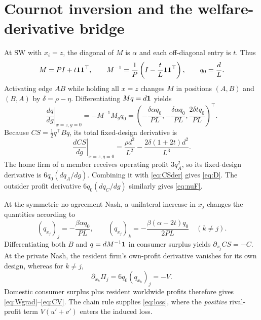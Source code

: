 \documentclass[11pt,a4paper]{article}
\theoremstyle{remark}\newtheorem{remark}[theorem]{Remark}
\newcommand{\SW}{\mathrm{SW}}\newcommand{\SU}{\mathrm{SU}}\newcommand{\IS}{\mathrm{IS}}
\begin{document}
\clearpage
\appendix
\section{Cournot inversion and the welfare-derivative bridge}\label{app:bridge}
At $\SW$ with $x_i=z$, the diagonal of $M$ is $\alpha$ and each off-diagonal entry is $t$. Thus
\begin{equation}\label{eq:inv}
M=P I+t\boldsymbol{1}\boldsymbol{1}^{\top},\qquad
M^{-1}=\frac1P\left(I-\frac{t}{L}\boldsymbol{1}\boldsymbol{1}^{\top}\right),\qquad q_0=\frac dL.
\end{equation}
Activating edge $AB$ while holding all $x=z$ changes $M$ in positions $(A,B)$ and $(B,A)$ by $\delta=\rho-\eta$. Differentiating $Mq=d\boldsymbol{1}$ yields
\begin{equation}\label{eq:quantityDer}
\left.\frac{dq}{dg}\right|_{x=z,g=0}=-M^{-1}M_gq_0
=\left(-\frac{\delta\alpha q_0}{PL},-\frac{\delta\alpha q_0}{PL},\frac{2\delta t q_0}{PL}\right)^\top.
\end{equation}
Because $CS=\tfrac12q^\top Bq$, its total fixed-design derivative is
\begin{equation}\label{eq:CSder}
\left.\frac{dCS}{dg}\right|_{x=z,g=0}
=\frac{\rho d^2}{L^2}-\frac{2\delta(1+2t)d^2}{L^3}.
\end{equation}
The home firm of a member receives operating profit $3q_A^2$, so its fixed-design derivative is $6q_0(dq_A/dg)$. Combining it with \eqref{eq:CSder} gives \eqref{eq:D}. The outsider profit derivative $6q_0(dq_C/dg)$ similarly gives \eqref{eq:nuF}.

At the symmetric no-agreement Nash, a unilateral increase in $x_j$ changes the quantities according to
\begin{equation}\label{eq:designQuantityBridge}
(q_{x_j})_j=-\frac{\beta\alpha q_0}{PL},\qquad
(q_{x_j})_k=-\frac{\beta(\alpha-2t)q_0}{2PL}\quad(k\ne j).
\end{equation}
Differentiating both $B$ and $q=dM^{-1}\boldsymbol{1}$ in consumer surplus yields $\partial_{x_j}CS=-C$. At the private Nash, the resident firm's own-profit derivative vanishes for its own design, whereas for $k\ne j$,
\begin{equation}\label{eq:crossProfitBridge}
\partial_{x_k}\Pi_j=6q_0(q_{x_k})_j=-V.
\end{equation}
Domestic consumer surplus plus resident worldwide profits therefore gives \eqref{eq:Wgrad}--\eqref{eq:CV}. The chain rule supplies \eqref{eq:loss}, where the \emph{positive} rival-profit term $V(u'+v')$ enters the induced loss.
\end{document}
